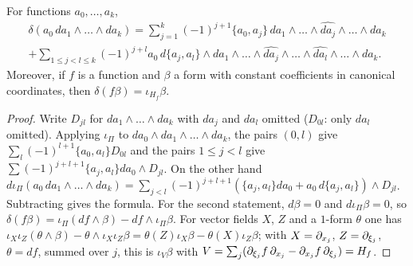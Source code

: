 \begin{lemma}\label{hochschild:lem:delta}
For functions $a_0,\dots,a_k$,
\begin{multline*}
  \delta(a_0\,da_1\wedge\dots\wedge da_k)=\sum_{j=1}^k(-1)^{j+1}\{a_0,a_j\}\,
  da_1\wedge\dots\wedge\widehat{da_j}\wedge\dots\wedge da_k\\
  +\sum_{1\le j<l\le k}(-1)^{j+l}a_0\,d\{a_j,a_l\}\wedge da_1\wedge\dots
  \wedge\widehat{da_j}\wedge\dots\wedge\widehat{da_l}\wedge\dots\wedge da_k .
\end{multline*}
Moreover, if $f$ is a function and $\beta$ a form with constant coefficients
in canonical coordinates, then $\delta(f\beta)=\iota_{H_f}\beta$.
\end{lemma}
\begin{proof}
Write $D_{jl}$ for $da_1\wedge\dots\wedge da_k$ with $da_j$ and $da_l$ omitted ($D_{0l}$: only $da_l$ omitted).
Applying $\iota_\Pi$ to $da_0\wedge da_1\wedge\dots\wedge da_k$, the pairs
$(0,l)$ give $\sum_l(-1)^{l+1}\{a_0,a_l\}D_{0l}$ and the pairs $1\le j<l$ give
$\sum(-1)^{j+l+1}\{a_j,a_l\}da_0\wedge D_{jl}$. On the other hand
$d\iota_\Pi(a_0\,da_1\wedge\dots\wedge da_k)=\sum_{j<l}(-1)^{j+l+1}
(\{a_j,a_l\}da_0+a_0\,d\{a_j,a_l\})\wedge D_{jl}$. Subtracting gives the
formula. For the second statement, $d\beta=0$ and $d\iota_\Pi\beta=0$, so
$\delta(f\beta)=\iota_\Pi(df\wedge\beta)-df\wedge\iota_\Pi\beta$. For vector
fields $X$, $Z$ and a $1$-form $\theta$ one has
$\iota_X\iota_Z(\theta\wedge\beta)-\theta\wedge\iota_X\iota_Z\beta=\theta(Z)\iota_X\beta-\theta(X)\iota_Z\beta$;
with $X=\partial_{x_j}$, $Z=\partial_{\xi_j}$, $\theta=df$, summed over $j$, this is
$\iota_V\beta$ with $V=\sum_j(\partial_{\xi_j}f\,\partial_{x_j}-\partial_{x_j}f\,\partial_{\xi_j})=H_f$.
\end{proof}

